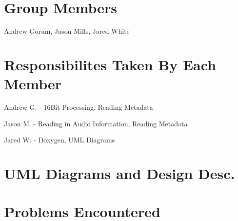 \section*{Group Members}

Andrew Gorum, Jason Mills, Jared White

\section*{Responsibilites Taken By Each Member}

Andrew G. -\/ 16\+Bit Processing, Reading Metadata

Jason M. -\/ Reading in Audio Information, Reading Metadata

Jared W. -\/ Doxygen, U\+ML Diagrams

\section*{U\+ML Diagrams and Design Desc.}

\section*{Problems Encountered}